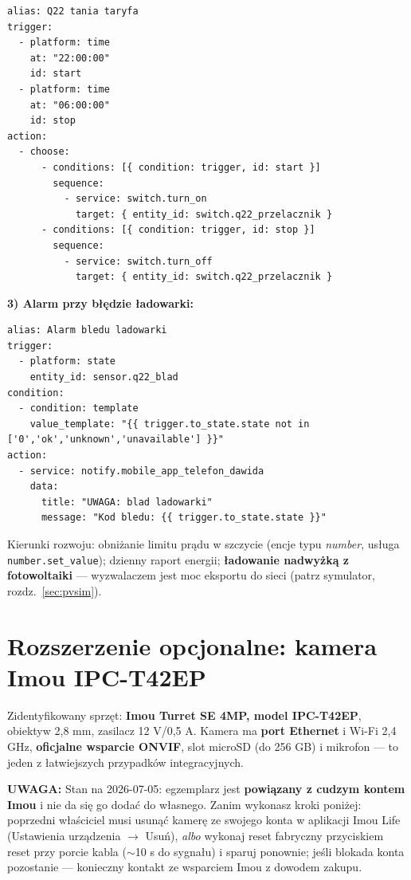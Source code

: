 \documentclass[11pt,a4paper]{article}
\newcommand{\uwaga}[1]{\par\medskip\noindent\textcolor{warnred}{\textbf{UWAGA:}} #1\par\medskip}
\begin{document}
\begin{lstlisting}
alias: Q22 tania taryfa
trigger:
  - platform: time
    at: "22:00:00"
    id: start
  - platform: time
    at: "06:00:00"
    id: stop
action:
  - choose:
      - conditions: [{ condition: trigger, id: start }]
        sequence:
          - service: switch.turn_on
            target: { entity_id: switch.q22_przelacznik }
      - conditions: [{ condition: trigger, id: stop }]
        sequence:
          - service: switch.turn_off
            target: { entity_id: switch.q22_przelacznik }
\end{lstlisting}

\textbf{3) Alarm przy błędzie ładowarki:}

\begin{lstlisting}
alias: Alarm bledu ladowarki
trigger:
  - platform: state
    entity_id: sensor.q22_blad
condition:
  - condition: template
    value_template: "{{ trigger.to_state.state not in ['0','ok','unknown','unavailable'] }}"
action:
  - service: notify.mobile_app_telefon_dawida
    data:
      title: "UWAGA: blad ladowarki"
      message: "Kod bledu: {{ trigger.to_state.state }}"
\end{lstlisting}

Kierunki rozwoju: obniżanie limitu prądu w szczycie (encje typu \emph{number}, usługa \texttt{number.set\_value}); dzienny raport energii; \textbf{ładowanie nadwyżką z fotowoltaiki} --- wyzwalaczem jest moc eksportu do sieci (patrz symulator, rozdz.~\ref{sec:pvsim}).

\section{Rozszerzenie opcjonalne: kamera Imou IPC-T42EP}
\label{sec:kamera}

Zidentyfikowany sprzęt: \textbf{Imou Turret SE 4MP, model IPC-T42EP}, obiektyw 2,8 mm, zasilacz 12 V/0,5 A. Kamera ma \textbf{port Ethernet} i Wi-Fi 2,4 GHz, \textbf{oficjalne wsparcie ONVIF}, slot microSD (do 256 GB) i mikrofon --- to jeden z łatwiejszych przypadków integracyjnych.

\uwaga{Stan na 2026-07-05: egzemplarz jest \textbf{powiązany z cudzym kontem Imou} i nie da się go dodać do własnego. Zanim wykonasz kroki poniżej: poprzedni właściciel musi usunąć kamerę ze swojego konta w aplikacji Imou Life (Ustawienia urządzenia $\to$ Usuń), \emph{albo} wykonaj reset fabryczny przyciskiem reset przy porcie kabla ($\sim$10 s do sygnału) i sparuj ponownie; jeśli blokada konta pozostanie --- konieczny kontakt ze wsparciem Imou z dowodem zakupu.}
\end{document}
